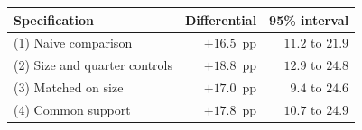 \begin{tabular}{lrr}
\toprule
Specification & Differential & 95\% interval \\
\midrule
(1) Naive comparison & $+16.5$~pp & $11.2$ to $21.9$ \\
(2) Size and quarter controls & $+18.8$~pp & $12.9$ to $24.8$ \\
(3) Matched on size & $+17.0$~pp & $9.4$ to $24.6$ \\
(4) Common support & $+17.8$~pp & $10.7$ to $24.9$ \\
\bottomrule
\end{tabular}
